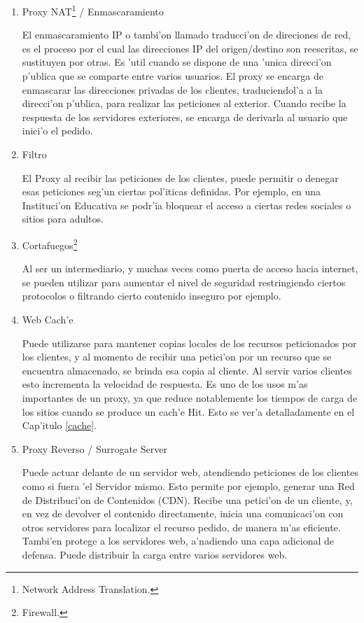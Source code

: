 \begin{enumerate}
\item Proxy NAT\footnote{Network Address Translation.} / Enmascaramiento

El enmascaramiento IP o tambi'on llamado traducci'on de direciones de red, es el proceso por el cual las direcciones IP del origen/destino son reescritas, se sustituyen por otras. Es 'util cuando se dispone de una 'unica direcci'on p'ublica que se comparte entre varios usuarios. El proxy se encarga de enmascarar las direcciones privadas de los clientes, traduciendol'a a la direcci'on p'ublica, para realizar las peticiones al exterior. Cuando recibe la respuesta de los servidores exteriores, se encarga de derivarla al usuario que inici'o el pedido.

\item Filtro

El Proxy al recibir las peticiones de los clientes, puede permitir o denegar esas peticiones seg'un ciertas pol'iticas definidas. Por ejemplo, en una Instituci'on Educativa se podr'ia bloquear el acceso a ciertas redes sociales o sitios para adultos.

\item Cortafuegos\footnote{Firewall.}

Al ser un intermediario, y muchas veces como puerta de acceso hacia internet, se pueden utilizar para aumentar el nivel de seguridad restringiendo ciertos protocolos o filtrando cierto contenido inseguro por ejemplo.

\item Web Cach'e

Puede utilizarse para mantener copias locales de los recursos peticionados por los clientes, y al momento de recibir una petici'on por un recurso que se encuentra almacenado, se brinda esa copia al cliente. Al servir varios clientes esto incrementa la velocidad de respuesta. Es uno de los usos m'as importantes de un proxy, ya que reduce notablemente los tiempos de carga de los sitios cuando se produce un cach'e Hit. Esto se ver'a detalladamente en el Cap'itulo \ref{cache}.

\item Proxy Reverso / Surrogate Server

Puede actuar delante de un servidor web, atendiendo peticiones de los clientes como si fuera 'el Servidor mismo. Esto permite por ejemplo, generar una Red de Distribuci'on de Contenidos (CDN). Recibe una petici'on de un cliente, y, en vez de devolver el contenido directamente, inicia una comunicaci'on con otros servidores para localizar el recurso pedido, de manera m'as eficiente. Tambi'en protege a los servidores web, a'nadiendo una capa adicional de defensa. Puede distribuir la carga entre varios servidores web.


\end{enumerate}
